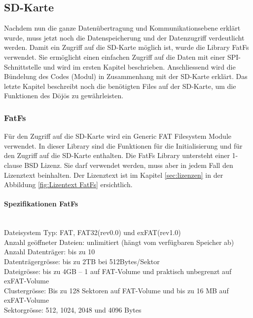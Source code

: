 \subsection{SD-Karte}\label{sec:sdKarte}

Nachdem nun die ganze Datenübertragung und Kommunikationsebene erklärt wurde, muss jetzt noch die Datenspeicherung und der Datenzugriff verdeutlicht werden. Damit ein Zugriff auf die SD-Karte möglich ist, wurde die Library FatFs verwendet. Sie ermöglicht einen einfachen Zugriff auf die Daten mit einer SPI-Schnittstelle und wird im ersten Kapitel beschrieben. Anschliessend wird die Bündelung des Codes (Modul) in Zusammenhang mit der SD-Karte erklärt. Das letzte Kapitel beschreibt noch die benötigten Files auf der SD-Karte, um die Funktionen des Dōjōs zu gewährleisten.

\subsubsection{FatFs}

Für den Zugriff auf die SD-Karte wird ein Generic FAT Filesystem Module verwendet. In dieser Library sind die Funktionen für die Initialisierung und für den Zugriff auf die SD-Karte enthalten. Die FatFs Library untersteht einer 1-clause BSD Lizenz. Sie darf verwendet werden, muss aber in jedem Fall den Lizenztext beinhalten. Der Lizenztext ist im Kapitel \ref{sec:lizenzen} in der Abbildung \ref{fig:Lizentext FatFs} ersichtlich.

\paragraph{Spezifikationen FatFs}$~~$\\
Dateisystem Typ: FAT, FAT32(rev0.0) und exFAT(rev1.0)\\
Anzahl geöffneter Dateien: unlimitiert (hängt vom verfügbaren Speicher ab)\\
Anzahl Datenträger: bis zu 10\\
Datenträgergrösse: bis zu 2TB bei 512Bytes/Sektor\\
Dateigrösse: bis zu 4GB – 1 auf FAT-Volume und praktisch unbegrenzt auf exFAT-Volume\\
Clustergrösse: Bis zu 128 Sektoren auf FAT-Volume und bis zu 16 MB auf exFAT-Volume	\\
Sektorgrösse:  512, 1024, 2048 und 4096 Bytes \cite{FatFs}\\ 

